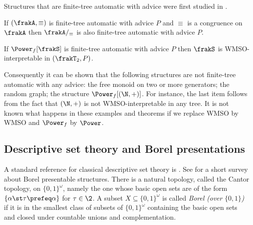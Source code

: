 Structures that are finite-tree automatic with advice were first studied in \cite{CoLo07}.

\begin{theorem} \cite{CoLo07}
If $(\frakA,\equiv)$ is finite-tree automatic with advice $P$ and $\equiv$ is a congruence on $\frakA$ then $\frakA/_\equiv$ is also finite-tree automatic with advice $P$.
\end{theorem}

\begin{theorem} \cite{CoLo07}
If $\Power_f[\frakS]$ is finite-tree automatic with advice $P$ then $\frakS$ is WMSO-interpretable in $(\frakT_2,P)$.
\end{theorem}

Consequently it can be shown that the following structures are not finite-tree automatic with any advice: the free monoid on two or more generators; the random graph; the structure $\Power_f[(\N,+)]$. For instance, the last item follows from the fact that $(\N,+)$ is not WMSO-interpretable in any tree. It is not known what happens in these examples and theorems if we replace WMSO by WMSO and $\Power_f$ by $\Power$.

\subsection{Descriptive set theory and Borel presentations}

A standard reference for classical descriptive set theory is \cite{Kech95}. See \cite{NiMo11} for a short survey about Borel presentable structures.
There is a natural topology, called the Cantor topology, on $\{0,1\}^\omega$, namely the one whose basic open
sets are of the form $\{\alpha \st \tau \prefeq \alpha\}$ for $\tau \in \2$.  A subset $X \subseteq \{0,1\}^\omega$ is called {\em Borel (over $\{0,1\}$)} if it is in the smallest
class of subsets of $\{0,1\}^\omega$ containing the basic open sets and closed under
countable unions and complementation. 

